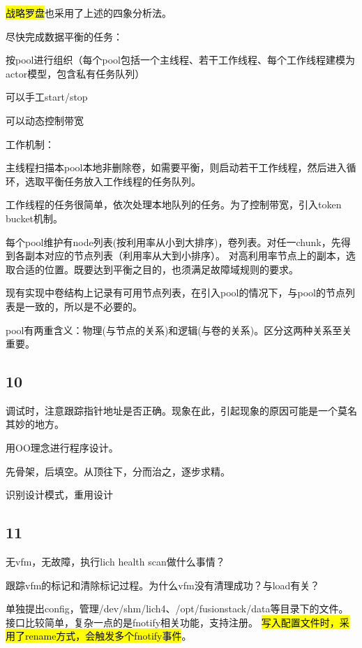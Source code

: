 \hl{战略罗盘}也采用了上述的四象分析法。

尽快完成数据平衡的任务：
\begin{enumbox}
\item 按pool进行组织（每个pool包括一个主线程、若干工作线程、每个工作线程建模为actor模型，包含私有任务队列）
\item 可以手工start/stop
\item 可以动态控制带宽
\end{enumbox}

工作机制：
\begin{enumbox}
\item 主线程扫描本pool本地非删除卷，如需要平衡，则启动若干工作线程，然后进入循环，选取平衡任务放入工作线程的任务队列。
\item 工作线程的任务很简单，依次处理本地队列的任务。为了控制带宽，引入token bucket机制。
\end{enumbox}

每个pool维护有node列表(按利用率从小到大排序)，卷列表。对任一chunk，先得到各副本对应的节点列表（利用率从大到小排序）。
对高利用率节点上的副本，选取合适的位置。既要达到平衡之目的，也须满足故障域规则的要求。

现有实现中卷结构上记录有可用节点列表，在引入pool的情况下，与pool的节点列表是一致的，所以是不必要的。

pool有两重含义：物理(与节点的关系)和逻辑(与卷的关系)。区分这两种关系至关重要。

\subsection{10}

调试时，注意跟踪指针地址是否正确。现象在此，引起现象的原因可能是一个莫名其妙的地方。

用OO理念进行程序设计。

先骨架，后填空。从顶往下，分而治之，逐步求精。

识别设计模式，重用设计

\subsection{11}

无vfm，无故障，执行lich health scan做什么事情？

跟踪vfm的标记和清除标记过程。为什么vfm没有清理成功？与load有关？

单独提出config，管理/dev/shm/lich4、/opt/fusionstack/data等目录下的文件。
接口比较简单，复杂一点的是fnotify相关功能，支持注册。
\hl{写入配置文件时，采用了rename方式，会触发多个fnotify事件}。

